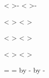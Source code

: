 {{{{{                                            \xdef\r@p@sbblly{\number\dimen100}
                                            \xdef\r@p@sbburx{-\number\dimen100}
                                            \xdef\r@p@sbbury{-\number\dimen100}}
%
                        \def\minmaxtest{
                           \ifnum\number\p@intvaluex<\r@p@sbbllx
                              \xdef\r@p@sbbllx{\number\p@intvaluex}\fi
                           \ifnum\number\p@intvaluex>\r@p@sbburx
                              \xdef\r@p@sbburx{\number\p@intvaluex}\fi
                           \ifnum\number\p@intvaluey<\r@p@sbblly
                              \xdef\r@p@sbblly{\number\p@intvaluey}\fi
                           \ifnum\number\p@intvaluey>\r@p@sbbury
                              \xdef\r@p@sbbury{\number\p@intvaluey}\fi
                           }
                        \rotate@{\@p@sbbllx}{\@p@sbblly}
                        \minmaxtest
                        \rotate@{\@p@sbbllx}{\@p@sbbury}
                        \minmaxtest
                        \rotate@{\@p@sbburx}{\@p@sbblly}
                        \minmaxtest
                        \rotate@{\@p@sbburx}{\@p@sbbury}
                        \minmaxtest
                        \edef\@p@sbbllx{\r@p@sbbllx}\edef\@p@sbblly{\r@p@sbblly}
                        \edef\@p@sbburx{\r@p@sbburx}\edef\@p@sbbury{\r@p@sbbury}
                \fi
                =\@p@sbburx
                =\@p@sbbury
                \advance{} by -\@p@sbbllx
                \advance{} by -\@p@sbblly
                \edef\@bbw{\number\count203}
                \edef\@bbh{\number\count204}
}
%
%
\def\in@hundreds#1#2#3{\count240=#2 \count241=#3
                     \count100=\count240        %
                     \divide\count100 by \count241
                     \count101=\count100
                     \multiply\count101 by \count241
                     \advance\count240 by -\count101
                     \multiply\count240 by 10
                     \count101=\count240        %
}}}}
